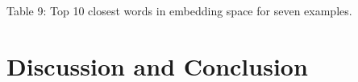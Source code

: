 \documentclass[11pt]{article}
\begin{document}
\begin{adjustbox}{width=\columnwidth,center}

\end{adjustbox}
\begin{center}
	Table 9: Top 10 closest words in embedding space for seven examples.
\end{center}

\section{Discussion and Conclusion}



\newpage
\printbibliography
\end{document}

